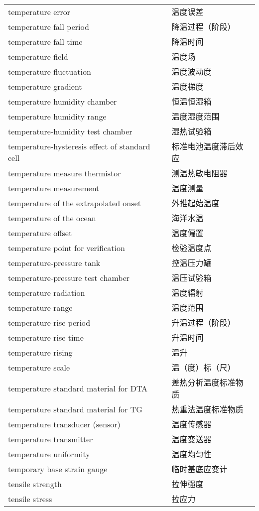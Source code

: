 \documentclass[
]{article}
\begin{document}
\begin{longtable}[]{@{}ll@{}}
temperature error & 温度误差 \\
temperature fall period & 降温过程（阶段） \\
temperature fall time & 降温时间 \\
temperature field & 温度场 \\
temperature fluctuation & 温度波动度 \\
temperature gradient & 温度梯度 \\
temperature humidity chamber & 恒温恒湿箱 \\
temperature humidity range & 温度湿度范围 \\
temperature-humidity test chamber & 湿热试验箱 \\
temperature-hysteresis effect of standard cell & 标准电池温度滞后效应 \\
temperature measure thermistor & 测温热敏电阻器 \\
temperature measurement & 温度测量 \\
temperature of the extrapolated onset & 外推起始温度 \\
temperature of the ocean & 海洋水温 \\
temperature offset & 温度偏置 \\
temperature point for verification & 检验温度点 \\
temperature-pressure tank & 控温压力罐 \\
temperature-pressure test chamber & 温压试验箱 \\
temperature radiation & 温度辐射 \\
temperature range & 温度范围 \\
temperature-rise period & 升温过程（阶段） \\
temperature rise time & 升温时间 \\
temperature rising & 温升 \\
temperature scale & 温（度）标（尺） \\
temperature standard material for DTA & 差热分析温度标准物质 \\
temperature standard material for TG & 热重法温度标准物质 \\
temperature transducer (sensor) & 温度传感器 \\
temperature transmitter & 温度变送器 \\
temperature uniformity & 温度均匀性 \\
temporary base strain gauge & 临时基底应变计 \\
tensile strength & 拉伸强度 \\
tensile stress & 拉应力 \\

\end{longtable}
\end{document}
